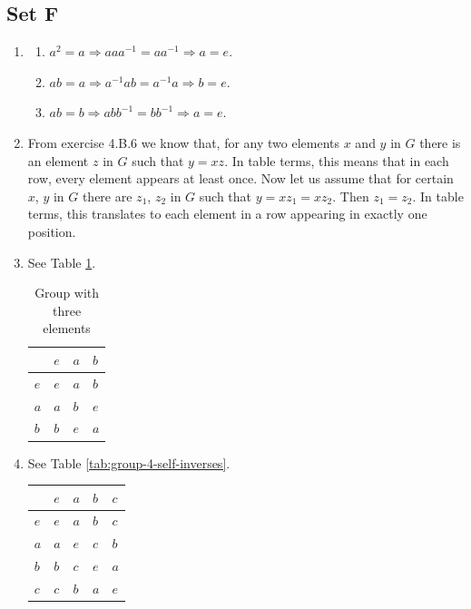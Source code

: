 \documentclass{article}
\begin{document}
\subsection{Set F}
\begin{enumerate}
    \item 
        \begin{enumerate}
            \item $a^2 = a \Rightarrow aaa^{-1} = aa^{-1} \Rightarrow a = e$.
            \item $ab = a \Rightarrow a^{-1}ab = a^{-1}a \Rightarrow b = e$.
            \item $ab = b \Rightarrow abb^{-1} = bb^{-1} \Rightarrow a = e$.
        \end{enumerate}
    \item From exercise 4.B.6 we know that, for any two elements $x$ and $y$ in $G$ there is an element $z$ in $G$ such that $y = xz$. In table terms, this means
        that in each row, every element appears at least once. Now let us assume that for certain $x$, $y$ in $G$ there are $z_1$, $z_2$ in $G$ such that $y = xz_1 = xz_2$.
        Then $z_1 = z_2$. In table terms, this translates to each element in a row appearing in exactly one position.
    \item See Table \ref{tab:group-3}.
        \begin{table}[!hb]
            \centering
            \begin{tabular}{l|lll}
            &$e$&$a$&$b$\\ \hline
            $e$&$e$&$a$&$b$\\
            $a$&$a$&$b$&$e$\\
            $b$&$b$&$e$&$a$
            \end{tabular}
            \caption{Group with three elements}
            \label{tab:group-3}
        \end{table}
    \item See Table \ref{tab:group-4-self-inverses}.
        \begin{table}[!ht]
            \centering
            \begin{tabular}{l|llll}
            &$e$&$a$&$b$&$c$\\ \hline
            $e$&$e$&$a$&$b$&$c$\\
            $a$&$a$&$e$&$c$&$b$\\
            $b$&$b$&$c$&$e$&$a$\\
            $c$&$c$&$b$&$a$&$e$
            \end{tabular}

\end{table}
\end{enumerate}
\end{document}
